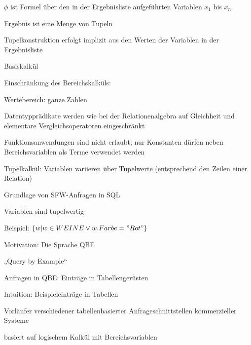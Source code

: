 \documentclass[a4paper]{article}
\begin{document}
\begin{multicols}{3}
\begin{itemize*}
\begin{itemize*}
\begin{itemize*}
                \item $\phi$ ist Formel über den in der Ergebnisliste aufgeführten Variablen $x_1$ bis $x_n$
                \item Ergebnis ist eine Menge von Tupeln
                \item Tupelkonstruktion erfolgt implizit aus den Werten der Variablen in der Ergebnisliste
            \end{itemize*}
            \item Basiskalkül
            \begin{itemize*}
                \item Einschränkung des Bereichskalküls:
                \begin{itemize*}
                    \item Wertebereich: ganze Zahlen
                    \item Datentypprädikate werden wie bei der Relationenalgebra auf Gleichheit und elementare Vergleichsoperatoren eingeschränkt
                    \item Funktionsanwendungen sind nicht erlaubt; nur Konstanten dürfen neben Bereichsvariablen als Terme verwendet werden
                \end{itemize*}
                \item Tupelkalkül: Variablen variieren über Tupelwerte (entsprechend den Zeilen einer Relation)
                \begin{itemize*}
                    \item Grundlage von SFW-Anfragen in SQL
                    \item Variablen sind tupelwertig
                    \item Beispiel: $\{w | w\in WEINE \vee w.Farbe = "Rot"\}$
                \end{itemize*}
            \end{itemize*}
        \end{itemize*}

        Motivation: Die Sprache QBE
        \begin{itemize*}
            \item „Query by Example“
            \item Anfragen in QBE: Einträge in Tabellengerüsten
            \item Intuition: Beispieleinträge in Tabellen
            \item Vorläufer verschiedener tabellenbasierter Anfrageschnittstellen kommerzieller Systeme
            \item basiert auf logischem Kalkül mit Bereichsvariablen
        \end{itemize*}


\end{itemize*}
\end{multicols}
\end{document}
